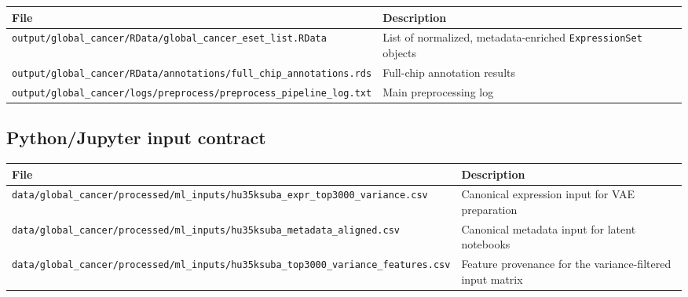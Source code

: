 \documentclass[
  letterpaper,
  DIV=11,
  numbers=noendperiod,
  openany,
  oneside]{scrreprt}
\begin{document}
\begin{longtable}[]{@{}
  >{\raggedright\arraybackslash}p{}
  >{\raggedright\arraybackslash}p{}@{}}
\toprule\noalign{}
\begin{minipage}[b]{\linewidth}\raggedright
File
\end{minipage} & \begin{minipage}[b]{\linewidth}\raggedright
Description
\end{minipage} \\
\midrule\noalign{}
\endhead
\bottomrule\noalign{}
\endlastfoot
\texttt{output/global\_cancer/RData/global\_cancer\_eset\_list.RData} &
List of normalized, metadata-enriched \texttt{ExpressionSet} objects \\
\texttt{output/global\_cancer/RData/annotations/full\_chip\_annotations.rds}
& Full-chip annotation results \\
\texttt{output/global\_cancer/logs/preprocess/preprocess\_pipeline\_log.txt}
& Main preprocessing log \\
\end{longtable}

\subsection*{Python/Jupyter input
contract}\label{pythonjupyter-input-contract}

\begin{longtable}[]{@{}
  >{\raggedright\arraybackslash}p{}
  >{\raggedright\arraybackslash}p{}@{}}
\toprule\noalign{}
\begin{minipage}[b]{\linewidth}\raggedright
File
\end{minipage} & \begin{minipage}[b]{\linewidth}\raggedright
Description
\end{minipage} \\
\midrule\noalign{}
\endhead
\bottomrule\noalign{}
\endlastfoot
\texttt{data/global\_cancer/processed/ml\_inputs/hu35ksuba\_expr\_top3000\_variance.csv}
& Canonical expression input for VAE preparation \\
\texttt{data/global\_cancer/processed/ml\_inputs/hu35ksuba\_metadata\_aligned.csv}
& Canonical metadata input for latent notebooks \\
\texttt{data/global\_cancer/processed/ml\_inputs/hu35ksuba\_top3000\_variance\_features.csv}
& Feature provenance for the variance-filtered input matrix \\
\end{longtable}
\end{document}
